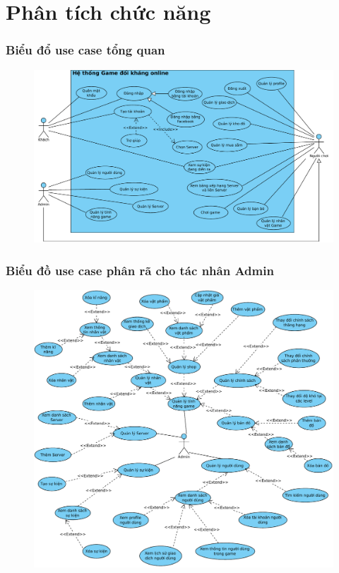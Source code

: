 \documentclass[3p]{elsarticle}
\begin{document}
\tableofcontents
\part{Phân tích chức năng}
\newpage
\section{Biểu đổ use case tổng quan}
\begin{figure}[!htbp]
	\hspace*{-.5in}
	\centering
	\includegraphics[scale=.8]{images/Overview.pdf}
\end{figure}
\newpage
\section{Biểu đồ use case phân rã cho tác nhân Admin}
\begin{figure}[!htbp]
	\hspace*{-.5in}
	\centering
	\includegraphics[scale=.8]{images/Admin.pdf}
\end{figure}
\newpage
\end{document}
